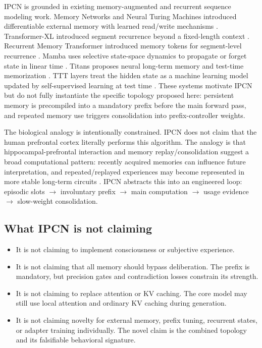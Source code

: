 \documentclass[11pt]{article}
\begin{document}
IPCN is grounded in existing memory-augmented and recurrent sequence modeling work. Memory Networks and Neural Turing Machines introduced differentiable external memory with learned read/write mechanisms \cite{weston2014memory,graves2014ntm}. Transformer-XL introduced segment recurrence beyond a fixed-length context \cite{dai2019transformerxl}. Recurrent Memory Transformer introduced memory tokens for segment-level recurrence \cite{bulatov2022rmt}. Mamba uses selective state-space dynamics to propagate or forget state in linear time \cite{gu2023mamba}. Titans proposes neural long-term memory and test-time memorization \cite{behrouz2024titans}. TTT layers treat the hidden state as a machine learning model updated by self-supervised learning at test time \cite{sun2024ttt}. These systems motivate IPCN but do not fully instantiate the specific topology proposed here: persistent memory is precompiled into a mandatory prefix before the main forward pass, and repeated memory use triggers consolidation into prefix-controller weights.

The biological analogy is intentionally constrained. IPCN does not claim that the human prefrontal cortex literally performs this algorithm. The analogy is that hippocampal-prefrontal interaction and memory replay/consolidation suggest a broad computational pattern: recently acquired memories can influence future interpretation, and repeated/replayed experiences may become represented in more stable long-term circuits \cite{preston2013hippocampus,brodt2023sleep,moscovitch2022systems}. IPCN abstracts this into an engineered loop: episodic slots \(\rightarrow\) involuntary prefix \(\rightarrow\) main computation \(\rightarrow\) usage evidence \(\rightarrow\) slow-weight consolidation.

\subsection{What IPCN is not claiming}

\begin{itemize}
    \item It is not claiming to implement consciousness or subjective experience.
    \item It is not claiming that all memory should bypass deliberation. The prefix is mandatory, but precision gates and contradiction losses constrain its strength.
    \item It is not claiming to replace attention or KV caching. The core model may still use local attention and ordinary KV caching during generation.
    \item It is not claiming novelty for external memory, prefix tuning, recurrent states, or adapter training individually. The novel claim is the combined topology and its falsifiable behavioral signature.
\end{itemize}
\end{document}
